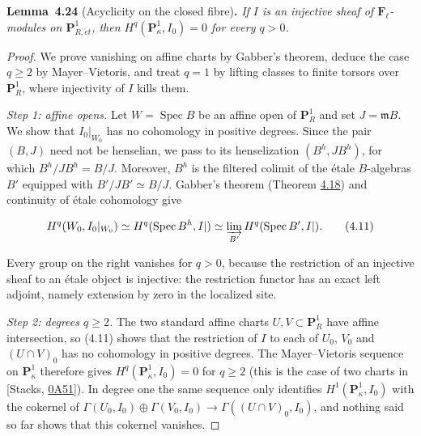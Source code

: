 \documentclass[11pt]{article}
\newenvironment{bpstatement}[2]{\par\addvspace{0.6\baselineskip}\noindent\textbf{#1}#2\textbf{.}\enspace\ignorespaces}
  {\par\addvspace{0.4\baselineskip}}
\newenvironment{bpstatementit}[2]{\begin{bpstatement}{#1}{#2}\itshape\ignorespaces}{\end{bpstatement}}
\begin{document}
\label{bp68}%
\begin{bpstatementit}{Lemma~4.24}{ (Acyclicity on the closed fibre)}
If \(I\) is an injective sheaf of \(\mathbf F_\ell\)-modules on \(\mathbf P^1_{R,\acute{e}t}\), then \(H^q(\mathbf P^1_\kappa,I_0)=0\) for every \(q>0\).
\end{bpstatementit}

\begin{proof}[{Proof}]\label{bp69}%
We prove vanishing on affine charts by Gabber's theorem, deduce the case \(q\geq2\) by Mayer–Vietoris, and treat \(q=1\) by lifting classes to finite torsors over \(\mathbf P^1_R\), where injectivity of \(I\) kills them.

\emph{Step 1: affine opens.} Let \(W=\operatorname{Spec}B\) be an affine open of \(\mathbf P^1_R\) and set \(J=\mathfrak mB\). We show that \(I_0|_{W_0}\) has no cohomology in positive degrees. Since the pair \((B,J)\) need not be henselian, we pass to its henselization \((B^h,JB^h)\), for which \(B^h/JB^h=B/J\). Moreover, \(B^h\) is the filtered colimit of the étale \(B\)-algebras \(B'\) equipped with \(B'/JB'\simeq B/J\). Gabber's theorem (Theorem \hyperref[bp51]{4.18}) and continuity of étale cohomology give

\[
H^q(W_0,I_0|_{W_0})
\simeq H^q(\operatorname{Spec}B^h,I|)
\simeq\varinjlim_{B'}H^q(\operatorname{Spec}B',I|).
\tag{4.11}
\]

Every group on the right vanishes for \(q>0\), because the restriction of an injective sheaf to an étale object is injective: the restriction functor has an exact left adjoint, namely extension by zero in the localized site.

\emph{Step 2: degrees \(q\geq2\).} The two standard affine charts \(U,V\subset \mathbf P^1_R\) have affine intersection, so (4.11) shows that the restriction of \(I\) to each of \(U_0\), \(V_0\) and \((U\cap V)_0\) has no cohomology in positive degrees. The Mayer–Vietoris sequence on \(\mathbf P^1_\kappa\) therefore gives \(H^q(\mathbf P^1_\kappa,I_0)=0\) for \(q\geq2\) (this is the case of two charts in [Stacks, \href{https://stacks.math.columbia.edu/tag/0A51}{0A51}]). In degree one the same sequence only identifies \(H^1(\mathbf P^1_\kappa,I_0)\) with the cokernel of \(\Gamma(U_0,I_0)\oplus\Gamma(V_0,I_0)\to\Gamma((U\cap V)_0,I_0)\), and nothing said so far shows that this cokernel vanishes.


\end{proof}
\end{document}
